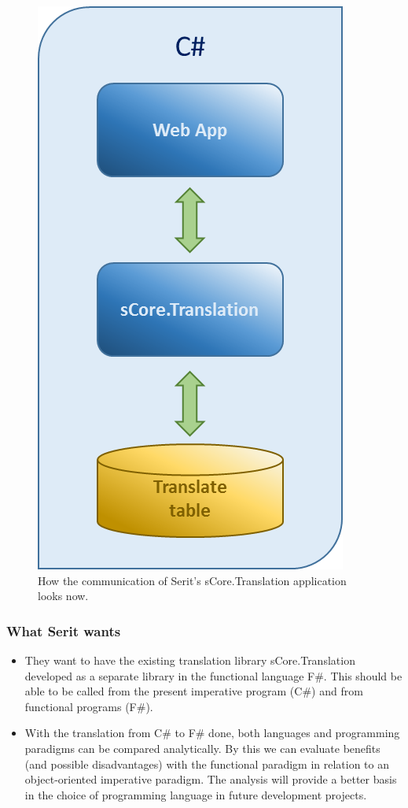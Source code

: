 \documentclass[12pt, a4paper]{article}
\begin{document}
\begin{figure}[!h]
    \includegraphics[scale=0.4]{image00}
    \centering
    \caption{How the communication of Serit's sCore.Translation application looks now.}
\end{figure}

\newpage
\subsubsection{What Serit wants}

\begin{itemize}
	\item They want to have the existing translation library sCore.Translation developed as a separate library in the functional language F\#. This should be able to be called from the present imperative program (C\#) and from functional programs (F\#).
	\item With the translation from C\# to F\# done, both languages and programming paradigms can be compared analytically. By this we can evaluate benefits (and possible disadvantages) with the functional paradigm in relation to an object-oriented imperative paradigm. The analysis will provide a better basis in the choice of programming language in future development projects.
\end{itemize}
\end{document}
